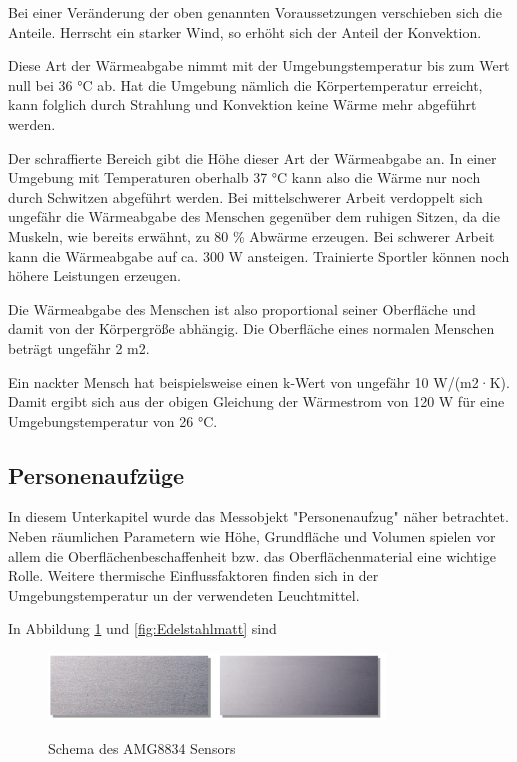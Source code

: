 Bei einer Veränderung der oben genannten Voraussetzungen verschieben sich die Anteile.
Herrscht ein starker Wind, so erhöht sich der Anteil der Konvektion.

Diese Art der Wärmeabgabe nimmt mit der Umgebungstemperatur bis zum Wert null bei 36 °C ab. Hat die Umgebung nämlich die
Körpertemperatur erreicht, kann folglich durch Strahlung und Konvektion keine Wärme mehr
abgeführt werden.

Der schraffierte Bereich gibt die Höhe dieser Art der
Wärmeabgabe an. In einer Umgebung mit Temperaturen oberhalb 37 °C kann also die Wärme
nur noch durch Schwitzen abgeführt werden. Bei mittelschwerer Arbeit verdoppelt sich
ungefähr die Wärmeabgabe des Menschen gegenüber dem ruhigen Sitzen, da die Muskeln,
wie bereits erwähnt, zu 80 \% Abwärme erzeugen. Bei schwerer Arbeit kann die Wärmeabgabe auf ca. 300 W ansteigen. Trainierte Sportler können noch höhere Leistungen erzeugen.

Die
Wärmeabgabe des Menschen ist also proportional seiner Oberfläche und damit von der Körpergröße abhängig. Die Oberfläche eines normalen Menschen beträgt ungefähr 2 m2.

Ein nackter Mensch hat beispielsweise einen k-Wert von
ungefähr 10 W/(m2·K). Damit ergibt sich aus der obigen Gleichung der Wärmestrom von 120
W für eine Umgebungstemperatur von 26 °C. \cite{MenschWaerme}

\subsection{Personenaufzüge}

In diesem Unterkapitel wurde das Messobjekt "Personenaufzug" näher betrachtet. Neben räumlichen Parametern wie Höhe, Grundfläche und Volumen spielen vor allem die Oberflächenbeschaffenheit bzw. das Oberflächenmaterial eine wichtige Rolle. Weitere thermische Einflussfaktoren finden sich in der Umgebungstemperatur un der verwendeten Leuchtmittel.



In Abbildung \ref{fig:Edelstahlgewalzt} und \ref{fig:Edelstahlmatt} sind 
\begin{figure}[H]
	\centering
	\includegraphics[width=0.8\textwidth]
	{fig/Edelstahl_gewalzt.PNG}
	\caption[Schema des AMG8834 Sensors]{Schema des AMG8834 Sensors} \protect\cite{Edelstahl}
	\label{fig:Edelstahlgewalzt}
\end{figure}


